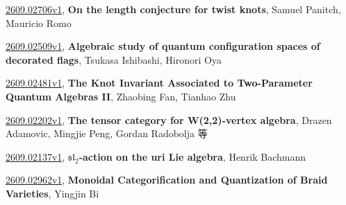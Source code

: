 \documentclass[9pt, a4paper]{article}
\theoremstyle{plain}
\theoremstyle{definition}
\theoremstyle{remark}
\newcommand{\arxiv}[3]{\href{https://arxiv.org/abs/#1}{#1}, \textbf{\textcolor{arxivblue}{#2}}, #3}
\begin{document}
\arxiv{2609.02706v1}{On the length conjecture for twist knots}{Samuel Panitch, Mauricio Romo}

\arxiv{2609.02509v1}{Algebraic study of quantum configuration spaces of decorated flags}{Tsukasa Ishibashi, Hironori Oya}

\arxiv{2609.02481v1}{The Knot Invariant Associated to Two-Parameter Quantum Algebras II}{Zhaobing Fan, Tianhao Zhu}

\arxiv{2609.02202v1}{The tensor category for W(2,2)-vertex algebra}{Drazen Adamovic, Mingjie Peng, Gordan Radobolja 等}

\arxiv{2609.02137v1}{$\mathfrak{sl}_2$-action on the uri Lie algebra}{Henrik Bachmann}

\arxiv{2609.02962v1}{Monoidal Categorification and Quantization of Braid Varieties}{Yingjin Bi}

\end{document}
